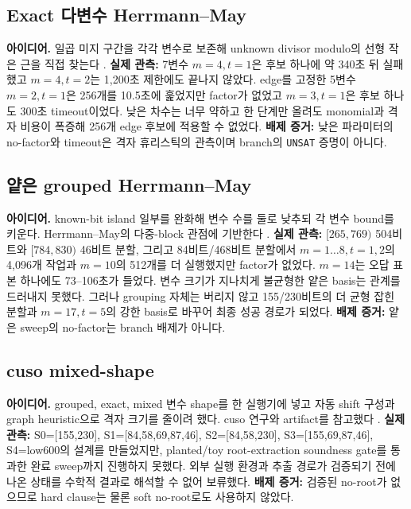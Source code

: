 \documentclass[10pt,a4paper]{article}
\newcommand{\evidence}[1]{\textbf{배제 증거:} #1}
\newcommand{\observed}[1]{\textbf{실제 관측:} #1}
\begin{document}
\subsection{Exact 다변수 Herrmann--May}

\textbf{아이디어.} 일곱 미지 구간을 각각 변수로 보존해 unknown divisor
modulo의 선형 작은 근을 직접 찾는다 \cite{herrmann-may}.
\observed{7변수 \(m=4,t=1\)은 후보 하나에 약 340초 뒤 실패했고
\(m=4,t=2\)는 1,200초 제한에도 끝나지 않았다. edge를 고정한 5변수
\(m=2,t=1\)은 256개를 10.5초에 훑었지만 factor가 없었고
\(m=3,t=1\)은 후보 하나도 300초 timeout이었다.}
낮은 차수는 너무 약하고 한 단계만 올려도 monomial과 격자 비용이
폭증해 256개 edge 후보에 적용할 수 없었다.
\evidence{낮은 파라미터의 no-factor와 timeout은 격자 휴리스틱의
관측이며 branch의 \texttt{UNSAT} 증명이 아니다.}

\subsection{얕은 grouped Herrmann--May}

\textbf{아이디어.} known-bit island 일부를 완화해 변수 수를 둘로 낮추되
각 변수 bound를 키운다. Herrmann--May의 다중-block 관점에 기반한다
\cite{herrmann-may}.
\observed{\([265,769)\) 504비트와 \([784,830)\) 46비트 분할,
그리고 84비트/468비트 분할에서 \(m=1\ldots8,t=1,2\)의 4,096개 작업과
\(m=10\)의 512개를 더 실행했지만 factor가 없었다. \(m=14\)는 오답
표본 하나에도 73--106초가 들었다.}
변수 크기가 지나치게 불균형한 얕은 basis는 관계를 드러내지 못했다.
그러나 grouping 자체는 버리지 않고 155/230비트의 더 균형 잡힌 분할과
\(m=17,t=5\)의 강한 basis로 바꾸어 최종 성공 경로가 되었다.
\evidence{얕은 sweep의 no-factor는 branch 배제가 아니다.}

\subsection{cuso mixed-shape}

\textbf{아이디어.} grouped, exact, mixed 변수 shape를 한 실행기에 넣고
자동 shift 구성과 graph heuristic으로 격자 크기를 줄이려 했다. cuso
연구와 artifact를 참고했다 \cite{ryan,ryan-artifact}.
\observed{S0=[155,230], S1=[84,58,69,87,46], S2=[84,58,230],
S3=[155,69,87,46], S4=low600의 설계를 만들었지만, planted/toy
root-extraction soundness gate를 통과한 완료 sweep까지 진행하지 못했다.}
외부 실행 환경과 추출 경로가 검증되기 전에 나온 상태를 수학적 결과로
해석할 수 없어 보류했다.
\evidence{검증된 no-root가 없으므로 hard clause는 물론 soft
no-root로도 사용하지 않았다.}
\end{document}
